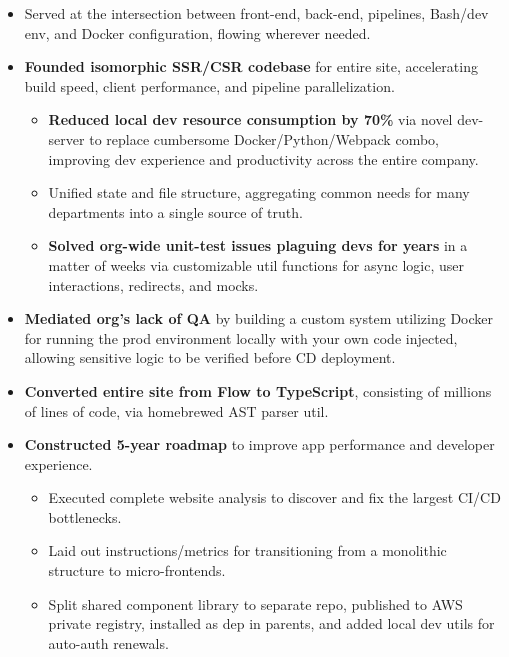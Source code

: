 \documentclass[10pt, letterpaper]{article}
\newcommand{\ul}[1]{%
    \begin{itemize}%
    #1%
    \end{itemize}%
}
\newcommand{\code}[1]{\small{\texttt{#1}}}
\begin{document}
\ul{
    \item Served at the intersection between front-end, back-end, pipelines, Bash/dev env, and Docker configuration, flowing wherever needed.

    \item \textbf{Founded isomorphic SSR/CSR codebase} for entire site, accelerating build speed, client performance, and pipeline parallelization.
    \ul {
        \item \textbf{Reduced local dev resource consumption by 70\%} via novel dev-server to replace cumbersome Docker/Python/Webpack combo, improving dev experience and productivity across the entire company.

        \item Unified state and file structure, aggregating common needs for many departments into a single source of truth.

        \item \textbf{Solved org-wide unit-test issues plaguing devs for years} in a matter of weeks via customizable util functions for async logic, user interactions, redirects, and mocks.
    }

    \item \textbf{Mediated org's lack of QA} by building a custom system utilizing Docker for running the prod environment locally with your own code injected, allowing sensitive logic to be verified before CD deployment.

    \item \textbf{Converted entire site from Flow to TypeScript}, consisting of millions of lines of code, via homebrewed AST parser util.

    \item \textbf{Constructed 5-year roadmap} to improve app performance and developer experience.
    \ul {
        \item Executed complete website analysis to discover and fix the largest CI/CD bottlenecks.

        \item Laid out instructions/metrics for transitioning from a monolithic structure to micro-frontends.

        \item Split shared component library to separate repo, published to AWS private registry, installed as dep in parents, and added local dev utils for auto-auth renewals.
    }

}
\end{document}
